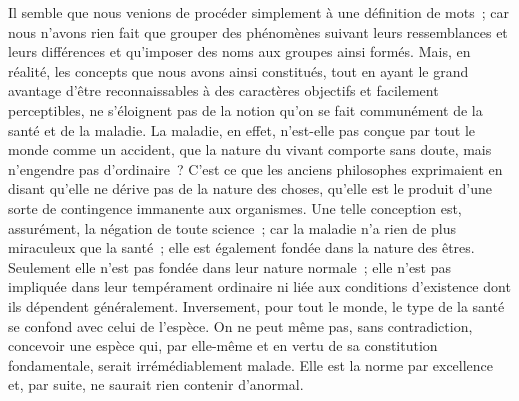 \documentclass[french,twoside]{book} %
\begin{document}
Il semble que nous venions de procéder simplement à une définition de mots ; car nous n’avons rien fait que grouper des phénomènes suivant leurs ressemblances et leurs différences et qu’imposer des noms aux groupes ainsi formés. Mais, en réalité, les concepts que nous avons ainsi constitués, tout en ayant le grand avantage d’être reconnaissables à des caractères objectifs et facilement perceptibles, ne s’éloignent pas de la notion qu’on se fait communément de la santé et de la maladie. La maladie, en effet, n’est-elle pas conçue par tout le monde comme un accident, que la nature du vivant comporte sans doute, mais n’engendre pas d’ordinaire ? C’est ce que les anciens philosophes exprimaient en disant qu’elle ne dérive pas de la nature des choses, qu’elle est le produit d’une sorte de contingence immanente aux organismes. Une telle conception est, assurément, la négation de toute science ; car la maladie n’a rien de plus miraculeux que la santé ; elle est également fondée dans la nature des êtres. Seulement elle n’est pas fondée dans leur nature normale ; elle n’est pas impliquée dans leur tempérament ordinaire ni liée aux conditions d’existence dont ils dépendent généralement. Inversement, pour tout le monde, le type de la santé se confond avec celui de l’espèce. On ne peut même pas, sans contradiction, concevoir une espèce qui, par elle-même et en vertu de sa constitution fondamentale, serait irrémédiablement malade. Elle est la norme par excellence et, par suite, ne saurait rien contenir d’anormal.\par
\end{document}
